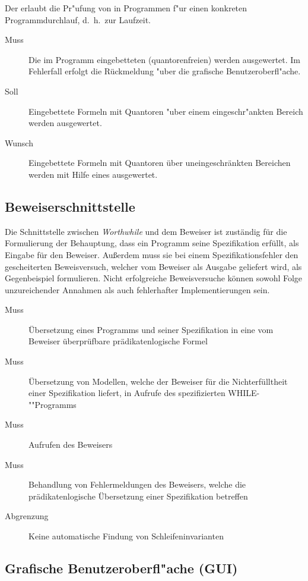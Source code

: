 Der  erlaubt die Pr"ufung von  in Programmen f"ur einen konkreten Programmdurchlauf, d.~h.\ zur Laufzeit.%

\begin{description}%
    \item [Muss] Die im Programm eingebetteten (quantorenfreien)  werden ausgewertet. Im Fehlerfall erfolgt die Rückmeldung "uber die grafische Benutzeroberfl"ache.
    \item [Soll] Eingebettete Formeln mit Quantoren "uber einem eingeschr"ankten Bereich werden ausgewertet.%
    \item [Wunsch] Eingebettete Formeln mit Quantoren über uneingeschränkten Bereichen werden mit Hilfe eines  ausgewertet.
\end{description}%

\subsection{Beweiserschnittstelle}%

Die Schnittstelle zwischen \textit{Worthwhile} und dem Beweiser ist zuständig für die Formulierung der Behauptung, dass ein Programm seine Spezifikation erfüllt, als Eingabe für den Beweiser. Außerdem muss sie bei einem Spezifikationsfehler den gescheiterten Beweisversuch, welcher vom Beweiser als Ausgabe geliefert wird, als Gegenbeispiel formulieren. Nicht erfolgreiche Beweisversuche können sowohl Folge unzureichender Annahmen als auch fehlerhafter Implementierungen sein.%

\begin{description}%
    \item [Muss] Übersetzung eines Programms und seiner Spezifikation in eine vom Beweiser überprüfbare prädikatenlogische Formel
    \item [Muss] Übersetzung von Modellen, welche der Beweiser für die Nichterfülltheit einer Spezifikation liefert, in Aufrufe des spezifizierten WHILE-""Programms%
    \item [Muss] Aufrufen des Beweisers
    \item [Muss] Behandlung von Fehlermeldungen des Beweisers, welche die prädikatenlogische Übersetzung einer Spezifikation betreffen%
    \item [Abgrenzung] Keine automatische Findung von Schleifeninvarianten
\end{description}%

\subsection{Grafische Benutzeroberfl"ache (GUI)}%

